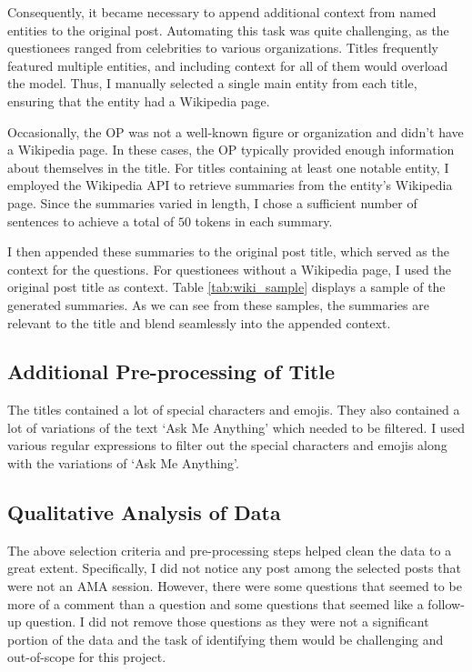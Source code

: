 \documentclass[paper=a4, fontsize=11pt]{scrartcl}
\numberwithin{equation}{section}		%
\numberwithin{figure}{section}			%
\numberwithin{table}{section}				%
\begin{document}
Consequently, it became necessary to append additional context from named entities to the original post. Automating this task was quite challenging, as the questionees ranged from celebrities to various organizations. Titles frequently featured multiple entities, and including context for all of them would overload the model. Thus, I manually selected a single main entity from each title, ensuring that the entity had a Wikipedia page.

Occasionally, the OP was not a well-known figure or organization and didn't have a Wikipedia page. In these cases, the OP typically provided enough information about themselves in the title. For titles containing at least one notable entity, I employed the Wikipedia API to retrieve summaries from the entity's Wikipedia page. Since the summaries varied in length, I chose a sufficient number of sentences to achieve a total of $50$ tokens in each summary.

I then appended these summaries to the original post title, which served as the context for the questions. For questionees without a Wikipedia page, I used the original post title as context. Table \ref{tab:wiki_sample} displays a sample of the generated summaries. As we can see from these samples, the summaries are relevant to the title and blend seamlessly into the appended context.


\subsection*{Additional Pre-processing of Title}
The titles contained a lot of special characters and emojis.
They also contained a lot of variations of the text `Ask Me Anything' which needed to be filtered.
I used various regular expressions to filter out the special characters and emojis along with the variations of `Ask Me Anything'.


\subsection*{Qualitative Analysis of Data}
The above selection criteria and pre-processing steps helped clean the data to a great extent.
Specifically, I did not notice any post among the selected posts that were not an AMA session.
However, there were some questions that seemed to be more of a comment than a question and some questions that seemed like a follow-up question.
I did not remove those questions as they were not a significant portion of the data and the task of identifying them would be challenging and out-of-scope for this project.
\end{document}
